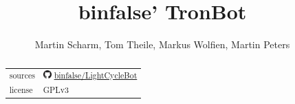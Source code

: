 \documentclass[a4paper,10pt]{scrartcl}
\title{binfalse' TronBot}
\author{Martin Scharm, Tom Theile, Markus Wolfien, Martin Peters}
\begin{document}
\maketitle

\begin{abstract}
\begin{center}
\begin{tabular}{ll}
sources & \includegraphics[height=1em]{GitHub-Mark-120px-plus.png} \href{https://github.com/binfalse/LightCycleBot}{binfalse/LightCycleBot}\\
license & GPLv3\\
\end{tabular}
\end{center}

\end{abstract}


\end{document}
